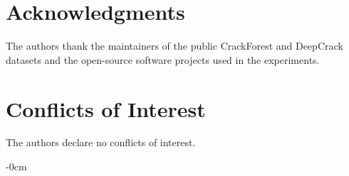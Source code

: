 \documentclass[applsci,article,submit,pdftex,moreauthors]{Definitions/mdpi}
\begin{document}
\section{Acknowledgments}

The authors thank the maintainers of the public CrackForest and
DeepCrack datasets and the open-source software projects used in the
experiments.

\section{Conflicts of Interest}

The authors declare no conflicts of interest.



\begin{adjustwidth}{-\extralength}{0cm}

\PublishersNote{}
\end{adjustwidth}
\end{document}
